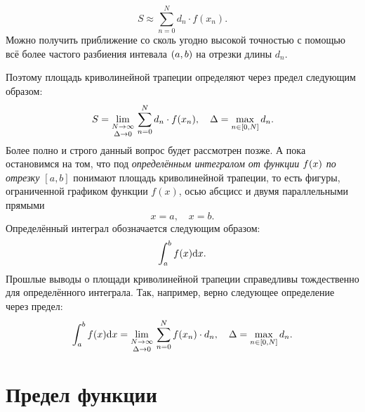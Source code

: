 \documentclass[12pt]{article}
\begin{document}
\begin{equation}
    S \approx \sum_{n=0}^{N} d_n \cdot f(x_n).
\end{equation}
Можно получить приближение со сколь угодно высокой точностью с помощью всё более частого разбиения интевала $\qty(a,b)$ на отрезки длины $d_n$.
\par
Поэтому площадь криволинейной трапеции определяют через предел следующим образом:
\begin{equation}
    S = \underset{\Delta \rightarrow 0}{\lim_{N \rightarrow \infty}}\ { \sum_{n=0}^{N} d_n \cdot f(x_n)}, \quad \Delta = \max_{n\in \qty[0,N]}{d_n}.
\end{equation}
Более полно и строго данный вопрос будет рассмотрен позже. А пока остановимся на том, что под \emph{определённым интегралом от функции $f\qty(x)$ по отрезку $[a,b]$} понимают площадь криволинейной трапеции, то есть фигуры, ограниченной графиком функции $f(x)$, осью абсцисс и двумя параллельными прямыми 
\begin{equation}
    x=a,\quad x=b.
\end{equation}
Определённый интеграл обозначается следующим образом:
\begin{equation}
    \int_{a}^{b} f\qty(x) \dd x.
\end{equation}
Прошлые выводы о площади криволинейной трапеции справедливы тождественно для определённого интеграла. Так, например, верно следующее определение через предел:
\begin{equation}\label{eq:int}
    \int_{a}^{b} f\qty(x) \dd x = \underset{\Delta \rightarrow 0}{\lim_{N \rightarrow \infty}}\ { \sum_{n=0}^{N} f(x_n) \cdot d_n}, \quad \Delta = \max_{n\in \qty[0,N]}{d_n}.
\end{equation}

\section{Предел функции}
\end{document}
